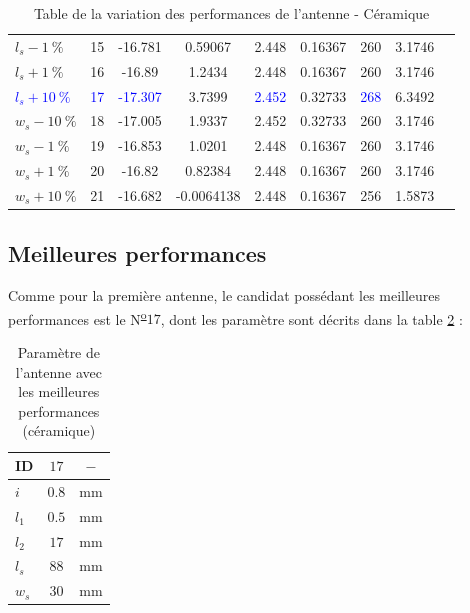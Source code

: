 \documentclass[Deriaz_Traiber_Labo02]{subfiles}
\begin{document}
\begin{table}[H]
\begin{tabular}{|l|c|cc|cc|cc|c|}
    $ l_s - \SI{ 1}{\percent}    $ &    15 &   -16.781 &      0.59067 &   2.448  &   0.16367 &    260  &     3.1746\\
    $ l_s + \SI{ 1}{\percent}    $ &    16 &    -16.89 &       1.2434 &   2.448  &   0.16367 &    260  &     3.1746\\
\textcolor{blue}{$ l_s + \SI{10}{\percent}    $} &   \textcolor{blue}{17}  &  \textcolor{blue}{-17.307}  &  3.7399  &  \textcolor{blue}{2.452}   &  0.32733  &  \textcolor{blue}{268}   &     6.3492\\\hline
    $ w_s - \SI{10}{\percent}    $ &   18  &  -17.005  &      1.9337  &  2.452   &  0.32733  &   260   &     3.1746\\
    $ w_s - \SI{ 1}{\percent}    $ &    19 &   -16.853 &       1.0201 &   2.448  &   0.16367 &    260  &     3.1746\\
    $ w_s + \SI{ 1}{\percent}    $ &    20 &    -16.82 &      0.82384 &   2.448  &   0.16367 &    260  &     3.1746\\
    $ w_s + \SI{10}{\percent}    $ &   21  &  -16.682  &  -0.0064138  &  2.448   &  0.16367  &   256   &     1.5873\\\hline
\end{tabular}
\caption{Table de la variation des performances de l'antenne - Céramique}
\label{tab:param-sweep-alumina}
\end{table}

\subsection{Meilleures performances}

Comme pour la première antenne, le candidat possédant les meilleures performances est le N\textsuperscript{\underline{o}}$17$, dont les paramètre sont décrits dans la table \ref{tab:best-perf-alumina} :

\begin{table}[H]
\centering
\begin{tabular}{||l c c||}    \hline
     ID      &   $17$    &  		$-$ \\\hline
     $i$     &   $0.8 $  &    \si{\milli\meter} \\ 
     $l_1$   &   $0.5$   &    \si{\milli\meter} \\ 
     $l_2$   &   $17  $  &    \si{\milli\meter} \\ 
     $l_s$   &   $88 $   &    \si{\milli\meter} \\ 
     $w_s$   &   $30$    &    \si{\milli\meter} \\\hline 
\end{tabular}
     \caption{Paramètre de l'antenne avec les meilleures performances (céramique)}
     \label{tab:best-perf-alumina}
\end{table}
\end{document}
